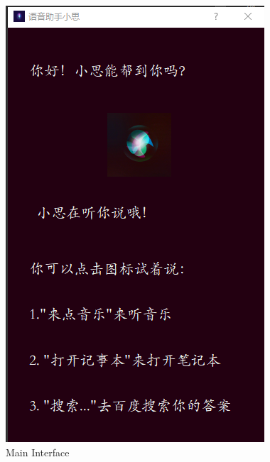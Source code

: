 \documentclass{hci}
\begin{document}
\begin{figure}[htb]
	\centering
	\includegraphics[width=0.5\linewidth]{../picture/2}
	\caption{Main Interface}
	\label{figure4}
\end{figure}
\end{document}

